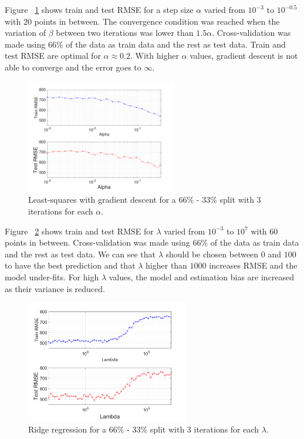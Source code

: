 \documentclass{article} %
\begin{document}
Figure ~\ref{fig:reg_alphaRMSE} shows train and test RMSE for a step size $\alpha$ varied from $10^{-3}$ to $10^{-0.5}$ with $20$ points in between. The convergence condition was reached when the variation of $\beta$ between two iterations was lower than $1.5 \alpha$. Cross-validation was made using $66 \% $ of the data as train data and the rest as test data. Train and test RMSE are optimal for $\alpha \approx 0.2$. With higher $\alpha$ values, gradient descent is not able to converge and the error goes to $\infty$.

\begin{figure}[!h] %
	\center
	\includegraphics[width=2.6in]{figures/alphaRMSE.png}
	\caption{Least-squares with gradient descent for a $66 \%$ - $33 \%$ split with 3 iterations for each $\alpha$.}
	\label{fig:reg_alphaRMSE}
\end{figure}

Figure ~\ref{fig:reg_lambdaRMSE} shows train and test RMSE for $\lambda$ varied from $10^{-3}$ to $10^{7}$ with $60$ points in between. Cross-validation was made using $66 \% $ of the data as train data and the rest as test data. We can see that $\lambda$ should be chosen between $0$ and $100$ to have the best prediction and that $\lambda$ higher than $1000$ increases RMSE and the model under-fits. For high $\lambda$ values, the model and estimation bias are increased as their variance is reduced.

\begin{figure}[!h] %
	\center
	\includegraphics[width=2.8in]{figures/lambdaRMSE.png}
	\caption{Ridge regression for a $66 \%$ - $33 \%$ split with 3 iterations for each $\lambda$.}
	\label{fig:reg_lambdaRMSE}
\end{figure}
\end{document}
